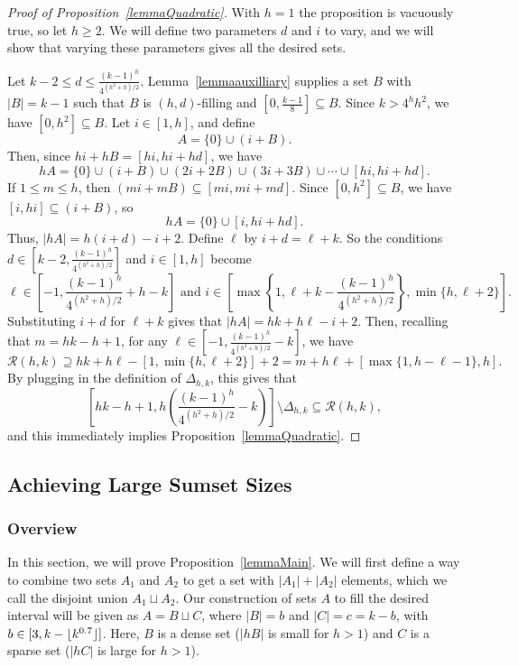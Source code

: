 \documentclass[10pt,a4paper]{article}
\theoremstyle{definition}
\theoremstyle{remark}
\numberwithin{equation}{section}
\numberwithin{theorem}{section}
\newcommand{\calr}{\mathcal{R}}
\DeclarePairedDelimiter{\floor}{\lfloor}{\rfloor}
\begin{document}
\begin{proof}[Proof of Proposition~\ref{lemmaQuadratic}]
With $h=1$ the proposition is vacuously true, so let $h \geq 2$. We will define two parameters $d$ and $i$ to vary, and we will show that varying these parameters gives all the desired sets. 

Let $k-2 \leq d \leq \frac{(k-1)^h}{4^{(h^2+h)/2}}$. Lemma~\ref{lemmaauxilliary} supplies a set $B$ with $|B| = k-1$ such that $B$ is $(h,d)$-filling and $[0,\frac{k-1}{8}] \subseteq B$. 
Since $k>4^hh^2$, we have $[0,h^2] \subseteq B$. Let $i \in [1,h]$, and define \[A = \{0\} \cup (i+B).\] Then, since $hi + hB = [hi,hi+hd]$, we have \[hA = \{0\} \cup (i +B) \cup (2i+2B) \cup (3i + 3B)  \cup \cdots \cup [hi,hi+hd].\] If $1 \leq m \leq h$, then $(mi + mB) \subseteq [mi,mi + md]$. Since $[0,h^2]\subseteq B$, we have $[i,hi] \subseteq (i + B)$, so \[hA = \{0\} \cup [i,hi+hd].\]
Thus, $|hA| = h(i+d)-i+2$. Define $\ell$ by $i+d = \ell+k$. So the conditions $d \in \left[k-2,\frac{(k-1)^h}{4^{(h^2+h)/2}}\right]$ and $i \in [1,h]$ become \[\ell \in \left[-1,\frac{(k-1)^h}{4^{(h^2+h)/2}}+h-k\right] \text{ and } i \in \left[\max\left\{1,\ell+k-\frac{(k-1)^h}{4^{(h^2+h)/2}}\right\}, \min\{h,\ell +2\}\right].\] 
Substituting $i+d$ for $\ell + k$ gives that $|hA| = hk + h\ell -i+2$. Then, recalling that $m = hk-h+1$, for any $\ell \in \left[-1,\frac{(k-1)^h}{4^{(h^2+h)/2}}-k\right]$, we have \[\calr(h,k) \supseteq hk+h\ell-[1,\min\{h,\ell +2\}]+2 = 
m + h\ell + [\max\{1,h-\ell-1\},h].\] By plugging in the definition of $\Delta_{h,k}$, this gives that \[\left[hk-h+1,h\left(\frac{(k-1)^h}{4^{(h^2+h)/2}}-k\right)\right]\setminus \Delta_{h,k} \subseteq \calr(h,k),\] and this immediately implies Proposition~\ref{lemmaQuadratic}.
\end{proof}


\subsection{Achieving Large Sumset Sizes}\label{sectlemmamain}

\subsubsection{Overview}
In this section, we will prove Proposition~\ref{lemmaMain}. We will first define a way to combine two sets $A_1$ and $A_2$ to get a set with $|A_1| + |A_2|$ elements, which we call the disjoint union $A_1 \sqcup A_2$. Our construction of sets $A$ to fill the desired interval will be given as $A = B \sqcup C$, where $|B| = b$ and $|C| = c = k-b$, with $b \in [3,k-\floor{k^{0.7}}]$. Here, $B$ is a dense set ($|hB|$ is small for $h>1$) and $C$ is a sparse set ($|hC|$ is large for $h>1$). 
\end{document}
